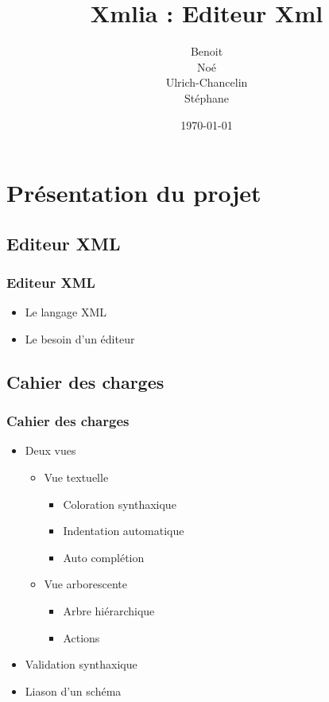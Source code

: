 \documentclass{beamer}
\title{Xmlia : Editeur Xml}
\author []{
\bsc{BOIVIN} Benoit\\
\bsc{LE PHILIPPE} Noé\\
\bsc{KEGBA-SANGO-SANGO} Ulrich-Chancelin\\
\bsc{WOUTERS} Stéphane
}
\institute{}
\date{\today}
\begin{document}
	\begin{frame}
		\titlepage
	\end{frame}

	\section{Présentation du projet}

  \subsection{Editeur XML}

  \begin{frame}
    \frametitle{Editeur XML}
     \begin{itemize}
      \item Le langage XML
      \pause
      \item Le besoin d'un éditeur
      \end{itemize}
  \end{frame}

	\subsection{Cahier des charges}

	\begin{frame}
		\frametitle{Cahier des charges}

    \begin{itemize}
    \item Deux vues
     \begin{itemize}
      \item Vue textuelle
       \pause
         \begin{itemize}
          \item Coloration synthaxique
          \pause
          \item Indentation automatique
          \pause
          \item Auto complétion
          \pause
          \end{itemize}
      \item Vue arborescente
      \pause
          \begin{itemize}
          \item Arbre hiérarchique
           \pause
          \item Actions
           \pause
          \end{itemize}
      \end{itemize}
    \item Validation synthaxique
    \pause
    \item Liason d'un schéma
    \end{itemize}

	\end{frame}
\end{document}
